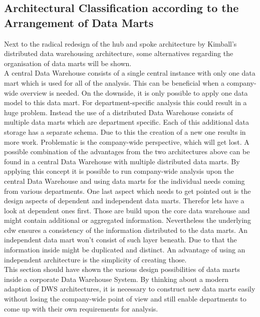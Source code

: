 \subsection{Architectural Classification according to the Arrangement of Data Marts}
Next to the radical redesign of the hub and spoke architecture by Kimball's distributed data warehousing architecture, some alternatives regarding the organisation of data marts will be shown.\newline
\\
A central Data Warehouse consists of a single central instance with only one data mart which is used for all of the analysis. This can be beneficial when a company-wide overview is needed. On the downside, it is only possible to apply one data model to this data mart. For department-specific analysis this could result in a huge problem. \newline
Instead the use of a distributed Data Warehouse consists of multiple data marts which are department specific. Each of this additional data storage has a separate schema. Due to this the creation of a new one results in more work. Problematic is the company-wide perspective, which will get lost. \newline
A possible combination of the advantages from the two architectures above can be found in a central Data Warehouse with multiple distributed data marts. By applying this concept it is possible to run company-wide analysis upon the central Data Warehouse and using data marts for the individual needs coming from various departments.
\newline
One last aspect which needs to get pointed out is the design aspects of dependent and independent data marts. Therefor lets have a look at dependent ones first. Those are build upon the core data warehouse and might contain additional or aggregated information. Nevertheless the underlying \acrshort{cdw} ensures a consistency of the information distributed to the data marts. An independent data mart won't consist of such layer beneath. Due to that the information inside might be duplicated and distinct. An advantage of using an independent architecture is the simplicity of creating those. \cite{scriptRasch} \newline
\\
This section should have shown the various design possibilities of data marts inside a corporate Data Warehouse System. By thinking about a modern adaption of DWS architectures, it is necessary to construct new data marts easily without losing the company-wide point of view and still enable departments to come up with their own requirements for analysis. 

